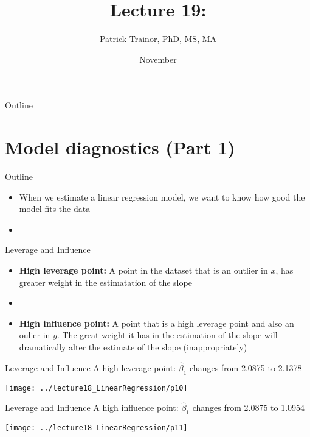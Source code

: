 \documentclass[xcolor=dvipsnames]{beamer}
\title[Lecture 19]{Lecture 19: }
\author[Patrick Trainor]{Patrick Trainor, PhD, MS, MA}
\institute[NMSU]{New Mexico State University}
\date{November}
\begin{document}
\begin{frame}
\maketitle
\end{frame}

\begin{frame}{Outline}
\tableofcontents[hideallsubsections]
\end{frame}

\section{Model diagnostics (Part 1)}
\begin{frame}{Outline}
\tableofcontents[currentsection,subsectionstyle=show/shaded/hide]
\end{frame}

\begin{frame}
	\begin{itemize}
		\item When we estimate a linear regression model, we want to know how good the model fits the data
		\item[]
	\end{itemize}
\end{frame}

\begin{frame}{Leverage and Influence}
	\begin{itemize}
		\item \textbf{High leverage point:} A point in the dataset that is an outlier in $x$, has greater weight in the estimatation of the slope
		\item[]
		\item \textbf{High influence point:} A point that is a high leverage point and also an oulier in $y$. The great weight it has in the estimation of the slope will dramatically alter the estimate of the slope (inappropriately)
	\end{itemize}
\end{frame}

\begin{frame}{Leverage and Influence}
A high leverage point: $\hat{\beta}_1$ changes from 2.0875 to 2.1378
	\begin{center}
		\texttt{[image: ../lecture18\_LinearRegression/p10]}
	\end{center}
\end{frame}

\begin{frame}{Leverage and Influence}
A high influence point: $\hat{\beta}_1$ changes from 2.0875 to 1.0954
\begin{center}
	\texttt{[image: ../lecture18\_LinearRegression/p11]}
\end{center}
\end{frame}
\end{document}
